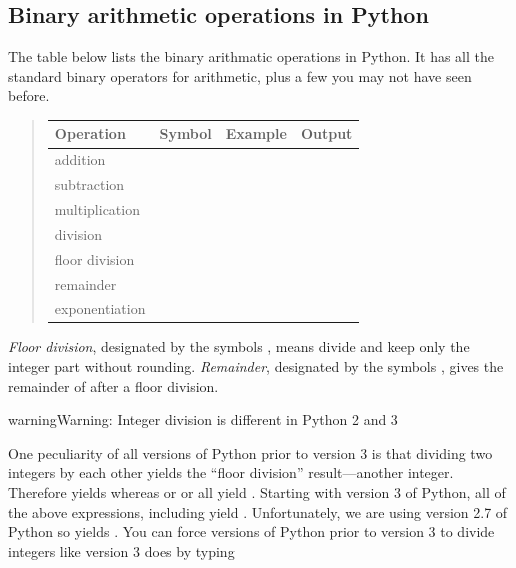 \documentclass[letterpaper,10pt,english]{sphinxmanual}
\begin{document}
\subsection{Binary arithmetic operations in Python}
\label{chap2/chap2_basics:binary-arithmetic-operations-in-python}
The table below lists the binary arithmatic operations in Python.  It has all the standard binary operators for arithmetic, plus a few you may not have seen before.
\begin{quote}

\begin{tabulary}{\linewidth}{|L|L|L|L|}
\hline
\textsf{\relax 
\textbf{Operation}
} & \textsf{\relax 
\textbf{Symbol}
} & \textsf{\relax 
\textbf{Example}
} & \textsf{\relax 
\textbf{Output}
}\\
\hline
addition
 & 
\code{+}
 & 
 & 
\\

subtraction
 & 
\code{-}
 & 
 & 
\\

multiplication
 & 
\code{*}
 & 
 & 
\\

division
 & 
\code{/}
 & 
 & 
\\

floor division
 & 
\code{//}
 & 
 & 
\\

remainder
 & 
\code{\%}
 & 
 & 
\\

exponentiation
 & 
\code{**}
 & 
 & 
\\
\hline\end{tabulary}

\end{quote}

\emph{Floor division}, designated by the symbols \code{//}, means divide and keep only the integer part without rounding.  \emph{Remainder}, designated by the symbols \code{\%}, gives the remainder of after a floor division.

\begin{notice}{warning}{Warning:}
Integer division is different in Python 2 and 3
\end{notice}

One peculiarity of all versions of Python prior to version 3 is that dividing two integers by each other yields the ``floor division'' result---another integer.  Therefore  yields  whereas  or  or  all yield .  Starting with version 3 of Python, all of the above expressions, including  yield .  Unfortunately, we are using version 2.7 of Python so  yields .  You can force versions of Python prior to version 3 to divide integers like version 3 does by typing
\end{document}
